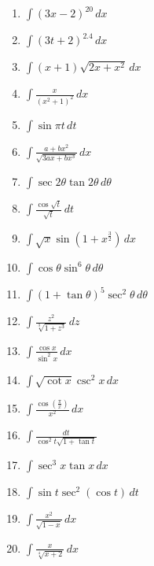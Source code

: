 \documentclass[12pt]{article}
\newcommand{\mins}{-}
\newcommand{\inline}[1]{\({#1}\)}
\begin{document}
\begin{enumerate}
            \item \inline{\int{} {(3x \mins{} 2)}^{20} \, dx}
            \item \inline{\int{} {(3t + 2)}^{2.4} \, dx}
            \item \inline{\int{} (x + 1) \sqrt{2x + x^2} \, dx}
            \item \inline{\int{} \frac{x}{{({x^2 + 1})}^2} \, dx}
            \item \inline{\int{} \sin{\pi{} t} \, dt}
            \item \inline{\int{} \frac{a + bx^2}{\sqrt{3ax + bx^3}} \, dx}
            \item \inline{\int{} \sec{2\theta{}} \tan{2\theta{}} \, d\theta}
            \item \inline{\int{} \frac{\cos{\sqrt{t}}}{\sqrt{t}} \, dt}
            \item \inline{\int{} \sqrt{x} \sin{(1 + x^{\frac{3}{2}})} \, dx}
            \item \inline{\int{} \cos{\theta{}} \sin^6{\theta{}} \, d\theta{}}
            \item \inline{\int{} {(1 + \tan{\theta})}^5 \sec^2{\theta{}} \, d\theta{}}
            \item \inline{\int{} \frac{z^2}{\sqrt[3]{1 + z^3}} \, dz}
            \item \inline{\int{} \frac{\cos{x}}{\sin^2{x}} \, dx}
            \item \inline{\int{} \sqrt{\cot{x}} \csc^2{x} \, dx}
            \item \inline{\int{} \frac{\cos{(\frac{\pi{}}{x})}}{x^2} \, dx}
            \item \inline{\int{} \frac{dt}{\cos^2{t} \sqrt{1 + \tan{t}}}}
            \item \inline{\int{} \sec^3{x} \tan{x} \, dx}
            \item \inline{\int{} \sin{t} \sec^2{(\cos{t})} \, dt}
            \item \inline{\int{} \frac{x^2}{\sqrt{1 \mins{} x}} \, dx}
            \item \inline{\int{} \frac{x}{\sqrt[4]{x + 2}} \, dx}
        \end{enumerate}
\end{document}
